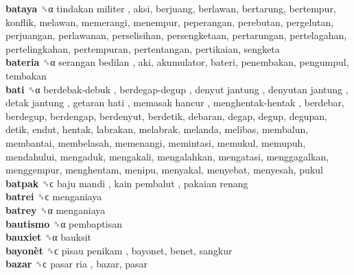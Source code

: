 \textbf{bataya} ␝α   tindakan militer , aksi, berjuang, berlawan, bertarung, bertempur, konflik, melawan, memerangi, menempur, peperangan, perebutan, pergelutan, perjuangan, perlawanan, perselisihan, persengketaan, pertarungan, pertelagahan, pertelingkahan, pertempuran, pertentangan, pertikaian, sengketa  \\
\textbf{bateria} ␝α   serangan bedilan , aki, akumulator, bateri, penembakan, pengumpul, tembakan  \\
\textbf{bati} ␝α   berdebak-debuk ,  berdegap-degup ,  denyut jantung ,  denyutan jantung ,  detak jantung ,  getaran hati ,  memasak hancur ,  menghentak-hentak , berdebar, berdegup, berdengap, berdenyut, berdetik, debaran, degap, degup, degupan, detik, endut, hentak, labrakan, melabrak, melanda, melibas, membalun, membantai, membelasah, memenangi, memintasi, memukul, memupuh, mendahului, mengaduk, mengakali, mengalahkan, mengatasi, menggagalkan, menggempur, menghentam, menipu, menyakal, menyebat, menyesah, pukul  \\
\textbf{batpak} ␝ϲ   baju mandi ,  kain pembalut ,  pakaian renang   \\
\textbf{batrei} ␝ϲ  menganiaya  \\
\textbf{batrey} ␝α  menganiaya  \\
\textbf{bautismo} ␝α  pembaptisan  \\
\textbf{bauxiet} ␝α  bauksit  \\
\textbf{bayonèt} ␝ϲ   pisau penikam , bayonet, benet, sangkur  \\
\textbf{bazar} ␝ϲ   pasar ria , bazar, pasar  \\
